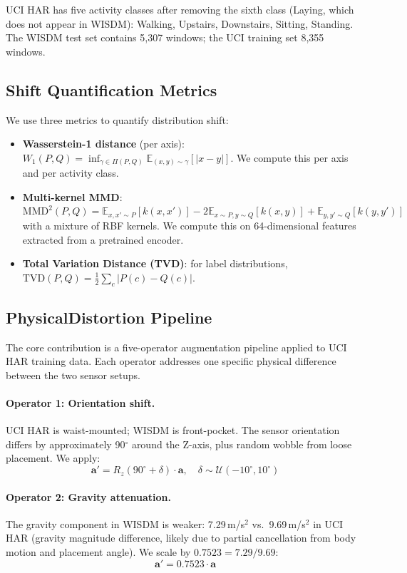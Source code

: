 \documentclass[12pt]{article}
\begin{document}
UCI HAR has five activity classes after removing the sixth class (Laying, which does not appear in WISDM): Walking, Upstairs, Downstairs, Sitting, Standing. The WISDM test set contains 5{,}307 windows; the UCI training set 8{,}355 windows.

\subsection{Shift Quantification Metrics}

We use three metrics to quantify distribution shift:
\begin{itemize}
    \item \textbf{Wasserstein-1 distance} (per axis): $W_1(P, Q) = \inf_{\gamma \in \Pi(P,Q)} \mathbb{E}_{(x,y) \sim \gamma}[|x - y|]$. We compute this per axis and per activity class.
    \item \textbf{Multi-kernel MMD}: $\text{MMD}^2(P, Q) = \mathbb{E}_{x,x' \sim P}[k(x,x')] - 2\mathbb{E}_{x \sim P, y \sim Q}[k(x,y)] + \mathbb{E}_{y,y' \sim Q}[k(y,y')]$ with a mixture of RBF kernels. We compute this on 64-dimensional features extracted from a pretrained encoder.
    \item \textbf{Total Variation Distance (TVD)}: for label distributions, $\text{TVD}(P, Q) = \frac{1}{2}\sum_c |P(c) - Q(c)|$.
\end{itemize}

\subsection{PhysicalDistortion Pipeline}

The core contribution is a five-operator augmentation pipeline applied to UCI HAR training data. Each operator addresses one specific physical difference between the two sensor setups.

\paragraph{Operator 1: Orientation shift.}
UCI HAR is waist-mounted; WISDM is front-pocket. The sensor orientation differs by approximately 90$^\circ$ around the Z-axis, plus random wobble from loose placement. We apply:
\begin{equation}
    \mathbf{a}' = R_z(90^\circ + \delta) \cdot \mathbf{a}, \quad \delta \sim \mathcal{U}(-10^\circ, 10^\circ)
\end{equation}

\paragraph{Operator 2: Gravity attenuation.}
The gravity component in WISDM is weaker: 7.29\,m/s$^2$ vs.\ 9.69\,m/s$^2$ in UCI HAR (gravity magnitude difference, likely due to partial cancellation from body motion and placement angle). We scale by $0.7523 = 7.29/9.69$:
\begin{equation}
    \mathbf{a}' = 0.7523 \cdot \mathbf{a}
\end{equation}
\end{document}
